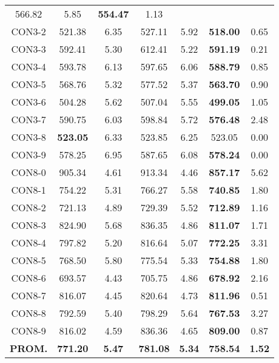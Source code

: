 \begin{table}[ht]
\begin{tabular}{c c c c c c c}
566.82 & 5.85 & \bf{554.47} & 
1.13\\CON3-2 & 521.38 & 6.35 & 
527.11 & 5.92 & \bf{518.00} & 
0.65\\CON3-3 & 592.41 & 5.30 & 
612.41 & 5.22 & \bf{591.19} & 
0.21\\CON3-4 & 593.78 & 6.13 & 
597.65 & 6.06 & \bf{588.79} & 
0.85\\CON3-5 & 568.76 & 5.32 & 
577.52 & 5.37 & \bf{563.70} & 
0.90\\CON3-6 & 504.28 & 5.62 & 
507.04 & 5.55 & \bf{499.05} & 
1.05\\CON3-7 & 590.75 & 6.03 & 
598.84 & 5.72 & \bf{576.48} & 
2.48\\CON3-8 & \bf{523.05} & 6.33 & 
523.85 & 6.25 & 523.05 & 0.00\\
CON3-9 & 578.25 & 6.95 & 
587.65 & 6.08 & \bf{578.24} & 
0.00\\CON8-0 & 905.34 & 4.61 & 
913.34 & 4.46 & \bf{857.17} & 
5.62\\CON8-1 & 754.22 & 5.31 & 
766.27 & 5.58 & \bf{740.85} & 
1.80\\CON8-2 & 721.13 & 4.89 & 
729.39 & 5.52 & \bf{712.89} & 
1.16\\CON8-3 & 824.90 & 5.68 & 
836.35 & 4.86 & \bf{811.07} & 
1.71\\CON8-4 & 797.82 & 5.20 & 
816.64 & 5.07 & \bf{772.25} & 
3.31\\CON8-5 & 768.50 & 5.80 & 
775.54 & 5.33 & \bf{754.88} & 
1.80\\CON8-6 & 693.57 & 4.43 & 
705.75 & 4.86 & \bf{678.92} & 
2.16\\CON8-7 & 816.07 & 4.45 & 
820.64 & 4.73 & \bf{811.96} & 
0.51\\CON8-8 & 792.59 & 5.40 & 
798.29 & 5.64 & \bf{767.53} & 
3.27\\CON8-9 & 816.02 & 4.59 & 
836.36 & 4.65 & \bf{809.00} & 
0.87\\\bf{PROM.} & 
\bf{771.20} & \bf{5.47} & \bf{781.08} & \bf{5.34} & \bf{758.54} & \bf{1.52}\\[1ex]\hline
\end{tabular}
\label{table:nonlin}
\end{table} \clearpage
